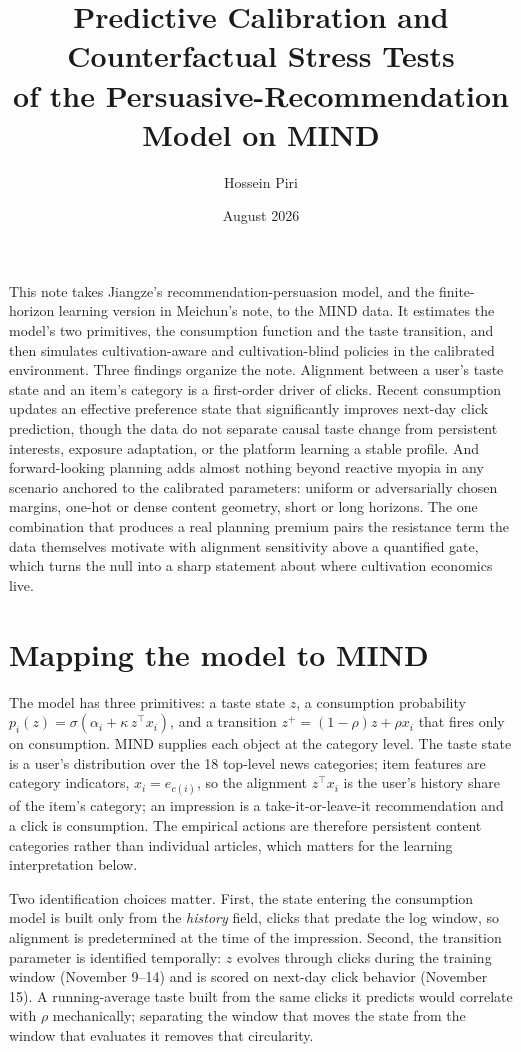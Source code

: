 \documentclass[11pt]{article}
\title{Predictive Calibration and Counterfactual Stress Tests\\ of the Persuasive-Recommendation Model on MIND}
\author{Hossein Piri}
\date{August 2026}
\begin{document}
\maketitle

\noindent
This note takes Jiangze's recommendation-persuasion model, and the
finite-horizon learning version in Meichun's note, to the MIND data. It
estimates the model's two primitives, the consumption function and the taste
transition, and then simulates cultivation-aware and cultivation-blind
policies in the calibrated environment. Three findings organize the note.
Alignment between a user's taste state and an item's category is a
first-order driver of clicks. Recent consumption updates an effective
preference state that significantly improves next-day click prediction,
though the data do not separate causal taste change from persistent
interests, exposure adaptation, or the platform learning a stable profile.
And forward-looking planning adds almost nothing beyond reactive myopia in
any scenario anchored to the calibrated parameters: uniform or adversarially
chosen margins, one-hot or dense content geometry, short or long horizons.
The one combination that produces a real planning premium pairs the
resistance term the data themselves motivate with alignment sensitivity
above a quantified gate, which turns the null into a sharp statement about
where cultivation economics live.

\section{Mapping the model to MIND}\label{sec:map}

The model has three primitives: a taste state $z$, a consumption probability
$p_i(z)=\sigma(\alpha_i+\kappa\, z^\top x_i)$, and a transition
$z^+=(1-\rho)z+\rho x_i$ that fires only on consumption. MIND supplies each
object at the category level. The taste state is a user's distribution over
the 18 top-level news categories; item features are category indicators,
$x_i=e_{c(i)}$, so the alignment $z^\top x_i$ is the user's history share of
the item's category; an impression is a take-it-or-leave-it recommendation
and a click is consumption. The empirical actions are therefore persistent
content categories rather than individual articles, which matters for the
learning interpretation below.

Two identification choices matter. First, the state entering the consumption
model is built only from the \emph{history} field, clicks that predate the
log window, so alignment is predetermined at the time of the impression.
Second, the transition parameter is identified temporally: $z$ evolves
through clicks during the training window (November 9--14) and is scored on
next-day click behavior (November 15). A running-average taste built from
the same clicks it predicts would correlate with $\rho$ mechanically;
separating the window that moves the state from the window that evaluates it
removes that circularity.
\end{document}
